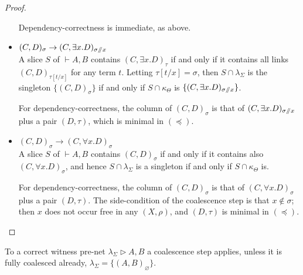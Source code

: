 \documentclass[UKenglish]{lipics-v2019}
\newcommand\+{+}
\renewcommand\*{\times}
\newcommand\dep{\preccurlyeq}
\newcommand\seq[2]{{\vdash}#1,#2}
\newcommand\net[3]{#1\triangleright #2,#3}
\newcommand\minus{\mathop{\!/\mathchoice{\kern-3pt}{\kern-3pt}{\kern-2.5pt}{\kern-2pt}/\!}}
\newcommand\link[3][\sigma]{(#2,#3)_{#1}}
\newcommand\scoal{\rightarrow} %
\begin{document}
\begin{proof}
\begin{itemize}
Dependency-correctness is immediate, as above.

	\item
$\link CD\scoal\link[\sigma\minus x]C{\exists x.D}$
\\
A slice $S$ of $\seq AB$ contains $\link[\tau] C{\exists x.D}$ if and only if it contains all links $\link[\tau{[t/x]}]CD$ for any term $t$. Letting $\tau[t/x]=\sigma$, then $S\cap \lambda_\Sigma$ is the singleton $\{\link CD\}$ if and only if $S\cap\kappa_\Theta$ is $\{\link[\sigma\minus x]C{\exists x.D}\}$.

For dependency-correctness, the column of $\link CD$ is that of $\link[\sigma\minus x]C{\exists x.D}$ plus a pair $(D,\tau)$, which is minimal in $(\dep)$.

	\item
$\link CD\scoal\link C{\forall x.D}$
\\
A slice $S$ of $\seq AB$ contains $\link CD$ if and only if it contains also $\link C{\forall x.D}$, and hence $S\cap\lambda_\Sigma$ is a singleton if and only if $S\cap\kappa_\Theta$ is.

For dependency-correctness, the column of $\link CD$ is that of $\link C{\forall x.D}$ plus a pair $(D,\tau)$. The side-condition of the coalescence step is that $x\notin\sigma$; then $x$ does not occur free in any $(X,\rho)$, and $(D,\tau)$ is minimal in $(\dep)$.
\qedhere
\end{itemize}
\end{proof}

\begin{lemma}
\label{lem:coalescence applies}
To a correct witness pre-net $\net{\lambda_\Sigma}AB$ a coalescence step applies, unless it is fully coalesced already, $\lambda_\Sigma=\{\link[\varnothing]AB\}$.
\end{lemma}
\end{document}

